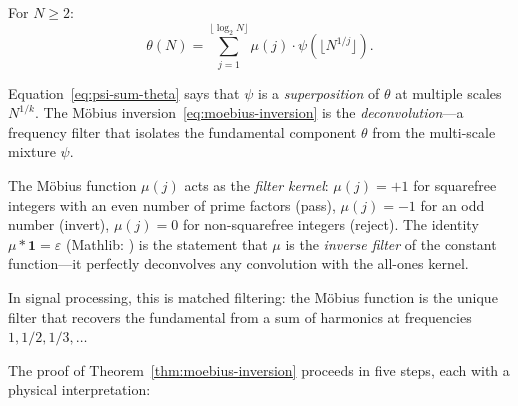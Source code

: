 \begin{theorem}
\label{thm:moebius-inversion}
For $N \geq 2$:
\begin{equation}
  \theta(N) = \sum_{j=1}^{\lfloor \log_2 N \rfloor}
  \mu(j) \cdot \psi(\lfloor N^{1/j} \rfloor).
  \label{eq:moebius-inversion}
\end{equation}
\end{theorem}

\begin{correspondence}
\label{corr:moebius-filter}
Equation~\eqref{eq:psi-sum-theta} says that $\psi$ is a
\emph{superposition} of $\theta$ at multiple scales $N^{1/k}$.
The M\"obius inversion~\eqref{eq:moebius-inversion} is the
\emph{deconvolution}---a frequency filter that isolates the
fundamental component $\theta$ from the multi-scale mixture $\psi$.

The M\"obius function $\mu(j)$ acts as the \emph{filter kernel}:
$\mu(j) = +1$ for squarefree integers with an even number of prime
factors (pass), $\mu(j) = -1$ for an odd number (invert),
$\mu(j) = 0$ for non-squarefree integers (reject). The identity
$\mu * \mathbf{1} = \varepsilon$ (Mathlib: )
is the statement that $\mu$ is the \emph{inverse filter} of the
constant function---it perfectly deconvolves any convolution with
the all-ones kernel.

In signal processing, this is matched filtering: the M\"obius
function is the unique filter that recovers the fundamental
from a sum of harmonics at frequencies $1, 1/2, 1/3, \ldots$
\end{correspondence}

The proof of Theorem~\ref{thm:moebius-inversion} proceeds in five steps,
each with a physical interpretation:

